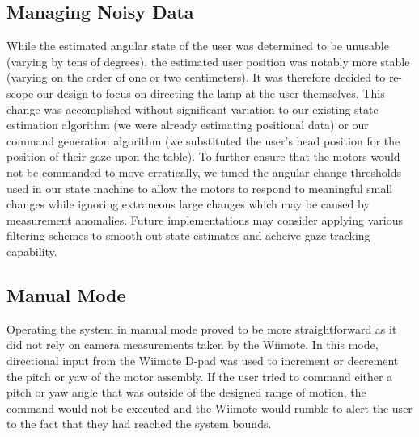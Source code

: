 \documentclass[conference, twocolumn]{IEEEtran}
\begin{document}
\subsection{Managing Noisy Data}
While the estimated angular state of the user was determined to be unusable (varying by tens of degrees), the estimated user position was notably more stable (varying on the order of one or two centimeters). It was therefore decided to re-scope our design to focus on directing the lamp at the user themselves. This change was accomplished without significant variation to our existing state estimation algorithm (we were already estimating positional data) or our command generation algorithm (we substituted the user's head position for the position of their gaze upon the table). To further ensure that the motors would not be commanded to move erratically, we tuned the angular change thresholds used in our state machine to allow the motors to respond to meaningful small changes while ignoring extraneous large changes which may be caused by measurement anomalies. Future implementations may consider applying various filtering schemes to smooth out state estimates and acheive gaze tracking capability.

\subsection{Manual Mode}
Operating the system in manual mode proved to be more straightforward as it did not rely on camera measurements taken by the Wiimote. In this mode, directional input from the Wiimote D-pad was used to increment or decrement the pitch or yaw of the motor assembly. If the user tried to command either a pitch or yaw angle that was outside of the designed range of motion, the command would not be executed and the Wiimote would rumble to alert the user to the fact that they had reached the system bounds.
\end{document}
